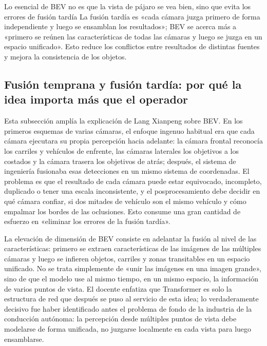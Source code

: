 \documentclass[a4paper]{article}
\begin{document}
\begin{importantbox}{Lo esencial de BEV no es que la vista de pájaro se vea bien, sino que evita los errores de fusión tardía}
La fusión tardía es «cada cámara juzga primero de forma independiente y luego se ensamblan los resultados»; BEV se acerca más a «primero se reúnen las características de todas las cámaras y luego se juzga en un espacio unificado». Esto reduce los conflictos entre resultados de distintas fuentes y mejora la consistencia de los objetos.
\end{importantbox}

\subsection{Fusión temprana y fusión tardía: por qué la idea importa más que el operador}

Esta subsección amplía la explicación de Lang Xianpeng sobre BEV. En los primeros esquemas de varias cámaras, el enfoque ingenuo habitual era que cada cámara ejecutara su propia percepción hacia adelante: la cámara frontal reconocía los carriles y vehículos de enfrente, las cámaras laterales los objetivos a los costados y la cámara trasera los objetivos de atrás; después, el sistema de ingeniería fusionaba esas detecciones en un mismo sistema de coordenadas. El problema es que el resultado de cada cámara puede estar equivocado, incompleto, duplicado o tener una escala inconsistente, y el posprocesamiento debe decidir en qué cámara confiar, si dos mitades de vehículo son el mismo vehículo y cómo empalmar los bordes de las oclusiones. Esto consume una gran cantidad de esfuerzo en «eliminar los errores de la fusión tardía».

La elevación de dimensión de BEV consiste en adelantar la fusión al nivel de las características: primero se extraen características de las imágenes de las múltiples cámaras y luego se infieren objetos, carriles y zonas transitables en un espacio unificado. No se trata simplemente de «unir las imágenes en una imagen grande», sino de que el modelo use al mismo tiempo, en un mismo espacio, la información de varios puntos de vista. El docente enfatiza que Transformer es solo la estructura de red que después se puso al servicio de esta idea; lo verdaderamente decisivo fue haber identificado antes el problema de fondo de la industria de la conducción autónoma: la percepción desde múltiples puntos de vista debe modelarse de forma unificada, no juzgarse localmente en cada vista para luego ensamblarse.
\end{document}
